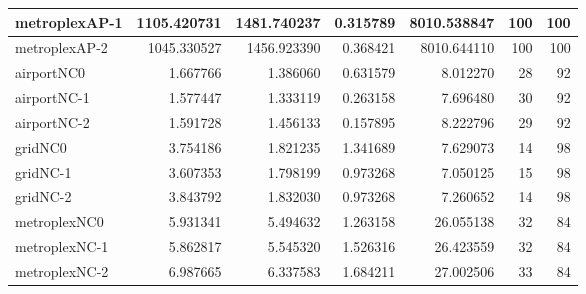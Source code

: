 \begin{longtable}{|l|r|r|r|r|r|r|}
metroplexAP-1 & 1105.420731 & 1481.740237 & 0.315789 & 8010.538847 & 100 & 100 \\ \hline
metroplexAP-2 & 1045.330527 & 1456.923390 & 0.368421 & 8010.644110 & 100 & 100 \\ \hline
airportNC0 & 1.667766 & 1.386060 & 0.631579 & 8.012270 & 28 & 92 \\ \hline
airportNC-1 & 1.577447 & 1.333119 & 0.263158 & 7.696480 & 30 & 92 \\ \hline
airportNC-2 & 1.591728 & 1.456133 & 0.157895 & 8.222796 & 29 & 92 \\ \hline
gridNC0 & 3.754186 & 1.821235 & 1.341689 & 7.629073 & 14 & 98 \\ \hline
gridNC-1 & 3.607353 & 1.798199 & 0.973268 & 7.050125 & 15 & 98 \\ \hline
gridNC-2 & 3.843792 & 1.832030 & 0.973268 & 7.260652 & 14 & 98 \\ \hline
metroplexNC0 & 5.931341 & 5.494632 & 1.263158 & 26.055138 & 32 & 84 \\ \hline
metroplexNC-1 & 5.862817 & 5.545320 & 1.526316 & 26.423559 & 32 & 84 \\ \hline
metroplexNC-2 & 6.987665 & 6.337583 & 1.684211 & 27.002506 & 33 & 84 \\ \hline
\end{longtable}
